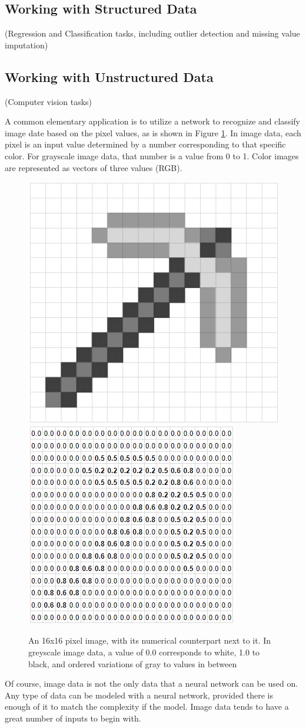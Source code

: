 \subsection{Working with Structured Data} %

(Regression and Classification tasks, including outlier detection and missing value imputation)

\subsection{Working with Unstructured Data} %

(Computer vision tasks)

A common elementary application is to utilize a network to recognize and classify image date based on the pixel values, as is shown in Figure \ref{minecraft}.  In image data, each pixel is an input value determined by a number corresponding to that specific color.  For grayscale image data, that number is a value from 0 to 1.  Color images are represented as vectors of three values (RGB).

\begin{figure}[H]
    \centering
    \includegraphics[width=.2\textwidth]{Figures/pickaxe_1.png}
    \hspace{60pt}
    \includegraphics[width=.5\textwidth]{Figures/pickaxe_2.png}
    \caption{\footnotesize{An 16x16 pixel image, with its numerical counterpart next to it.  In greyscale image data, a value of 0.0 corresponds to white, 1.0 to black, and ordered variations of gray to values in between}}
    \label{minecraft}
\end{figure}

Of course, image data is not the only data that a neural network can be used on.  Any type of data can be modeled with a neural network, provided there is enough of it to match the complexity if the model.  Image data tends to have a great number of inputs to begin with.